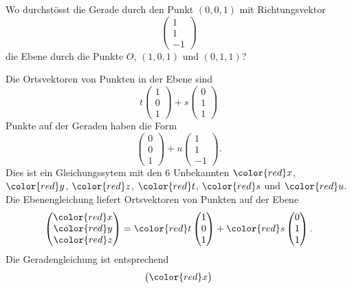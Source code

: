 Wo durchstösst die Gerade durch den Punkt $(0,0,1)$ mit Richtungsvektor
\[
\begin{pmatrix}1\\1\\-1\end{pmatrix}
\]
die Ebene durch die Punkte $O$, $(1,0,1)$ und $(0,1,1)$?


\begin{hinweis}
\end{hinweis}

\begin{loesung}
Die Ortsvektoren von Punkten in der Ebene sind
\[
t
\begin{pmatrix}1\\0\\1\end{pmatrix}
+
s
\begin{pmatrix}0\\1\\1\end{pmatrix}
\]
Punkte auf der Geraden haben die Form
\[
\begin{pmatrix}0\\0\\1\end{pmatrix}+u\begin{pmatrix}1\\1\\-1\end{pmatrix}.
\]
Dies ist ein Gleichungssytem mit den 6 Unbekannten
$\color{red}x$,
$\color{red}y$,
$\color{red}z$,
$\color{red}t$,
$\color{red}s$ und
$\color{red}u$.
Die Ebenengleichung liefert Ortsvektoren von Punkten auf der Ebene
\[
\begin{pmatrix}
{\color{red}x}\\
{\color{red}y}\\
{\color{red}z}
\end{pmatrix}
=
{\color{red}t}
\begin{pmatrix}1\\0\\1\end{pmatrix}
+
{\color{red}s}
\begin{pmatrix}0\\1\\1\end{pmatrix}.
\]
Die Geradengleichung ist entsprechend
\[
\begin{pmatrix}
{\color{red}x}\\

\end{pmatrix}\]
\end{loesung}

